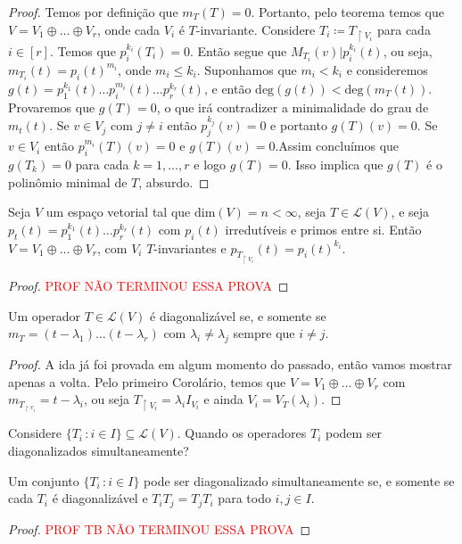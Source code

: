 \documentclass[11pt,twoside,a4paper]{book}
\begin{document}
\begin{proof}
  Temos por definição que \(m_T(T)=0\). Portanto, pelo teorema temos
  que \(V=V_1\oplus\ldots\oplus V_r\),
  onde cada \(V_i\) é \(T\)-invariante.
  Considere \(T_i\coloneqq T_{\upharpoonright V_i}\)
  para cada \(i\in [r]\).
  Temos que \(p_i^{k_i}(T_i)=0\). Então segue que \(M_{T_i}(v)\vert
  p_i^{k_i}(t)\), ou seja,
  \(m_{T_i}(t)=p_i(t)^{m_i}\), onde \(m_i\leq k_i\). Suponhamos que \(m_i <
  k_i\) e consideremos \(g(t)=p_1^{k_1}(t)\ldots p_i^{m_i}(t)\ldots
  p_r^{k_r}(t)\), e então \(\text{deg}(g(t))<\text{deg}(m_T(t))\). Provaremos
  que \(g(T)=0\), o que irá contradizer a minimalidade do grau de \(m_t(t)\). Se
  \(v\in V_j\) com \(j\not= i\) então \(p_j^{k_j}(v)=0\) e portanto
  \(g(T)(v)=0\). Se \(v\in V_i\) então \(p_i^{m_i}(T)(v)=0\) e
  \(g(T)(v)=0\).Assim concluímos que
  \(g(T_k)=0\) para cada \(k=1,\ldots ,r\) e logo \(g(T)=0\).
  Isso implica que \(g(T)\) é o polinômio minimal de \(T\), absurdo.
 \end{proof}
\begin{corolario}
  Seja \(V\) um espaço vetorial tal que \(\text{dim}(V)=n<\infty\), seja
  \(T\in\mathcal{L}(V)\), e seja
  \(p_t(t)=p_1^{k_1}(t)\ldots p_r^{k_r}(t)\) com
  \(p_i(t)\) irredutíveis e primos entre si.
  Então \(V=V_1\oplus\ldots\oplus
  V_r\), com \(V_i\) \(T\)-invariantes e
  \(p_{T_{\upharpoonright V_i}}(t)=p_i(t)^{k_i}\).
  \end{corolario}
  \begin{proof}
    \textcolor{red}{PROF NÃO TERMINOU ESSA PROVA}
    \end{proof}
  \begin{corolario}
    Um operador \(T\in\mathcal{L}(V)\) é diagonalizável se, e somente se
    \(m_T=(t-\lambda_1)\ldots(t-\lambda_r)\) com
    \(\lambda_i\not=\lambda_j\) sempre que \(i\not= j\).
  \end{corolario}
  \begin{proof}
    A ida já foi provada em algum momento do passado, então
    vamos mostrar apenas a volta. Pelo primeiro Corolário, temos que
    \(V=V_1\oplus\ldots\oplus V_r\) com \(m_{T_{\upharpoonright
        v_i}}=t-\lambda_i\), ou seja \(T_{\upharpoonright V_i}=\lambda_i
    I_{V_i}\) e ainda \(V_i=V_T(\lambda_i)\). 
  \end{proof}

    Considere \(\{T_i\,\colon i\in I\}\subseteq\mathcal{L}(V)\).
    Quando os operadores \(T_i\) podem ser diagonalizados simultaneamente?

    \begin{teorema}
      Um conjunto \(\{T_i\,\colon i \in I\}\) pode ser diagonalizado
      simultaneamente se, e somente se cada \(T_i\) é diagonalizável e
      \(T_iT_j=T_jT_i\) para todo \(i,j\in I\).
      \end{teorema}
      \begin{proof}
        \textcolor{red}{PROF TB NÃO TERMINOU ESSA PROVA}
        \end{proof}
    






    \printindex
\end{document}
